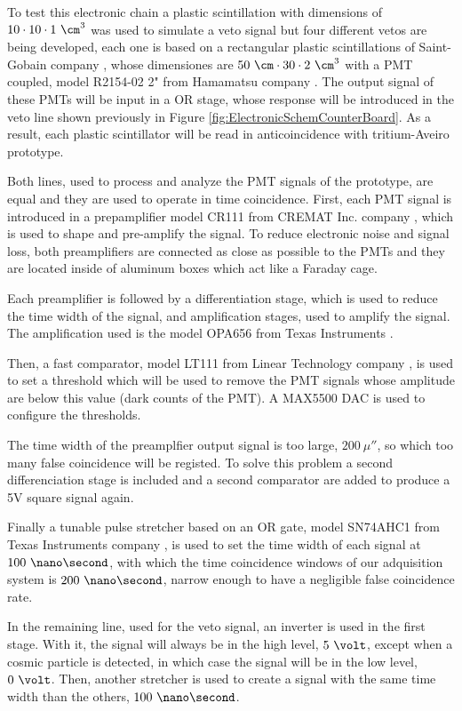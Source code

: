 \begin{enumerate}
To test this electronic chain a plastic scintillation with dimensions of $10 \cdot{} 10 \cdot{} 1~\cm^3$ was used to simulate a veto signal but four different vetos are being developed, each one is based on a rectangular plastic scintillations of Saint-Gobain company \cite{VetoAveiro}, whose dimensiones are $50~\cm \cdot{} 30 \cdot{} 2~\cm^3$  with a PMT coupled, model R2154-02 2" from Hamamatsu company \cite{DataSheetPMTsAveiro}. The output signal of these PMTs will be input in a OR stage, whose response will be introduced in the veto line shown previously in Figure \ref{fig:ElectronicSchemCounterBoard}. As a result, each plastic scintillator will be read in anticoincidence with tritium-Aveiro prototype.

Both lines, used to process and analyze the PMT signals of the prototype, are equal and they are used to operate in time coincidence. First, each PMT signal is introduced in a prepamplifier model CR111 from CREMAT Inc. company \cite{CREMATPreAmplifierDataSheet}, which is used to shape and pre-amplify the signal. To reduce electronic noise and signal loss, both preamplifiers are connected as close as possible to the PMTs and they are located inside of aluminum boxes which act like a Faraday cage.

Each preamplifier is followed by a differentiation stage, which is used to reduce the time width of the signal, and amplification stages, used to amplify the signal. The amplification used is the model OPA656 from Texas Instruments \cite{OPA656}. 

Then, a fast comparator, model LT111 from Linear Technology company \cite{LT111}, is used to set a threshold which will be used to remove the PMT signals whose amplitude are below this value (dark counts of the PMT). A MAX5500 DAC is used to configure the thresholds.

The time width of the preamplfier output signal is too large, $200~\mu\second$, so which too many false coincidence will be registed. To solve this problem a second differenciation stage is included and a second comparator are added to produce a 5V square signal again.

Finally a tunable pulse stretcher based on an OR gate, model SN74AHC1 from Texas Instruments company \cite{Stretcher}, is used to set the time width of each signal at $100~\nano\second$, with which the time coincidence windows of our adquisition system is $200~\nano\second$, narrow enough to have a negligible false coincidence rate.

In the remaining line, used for the veto signal, an inverter is used in the first stage. With it, the signal will always be in the high level, $5~\volt$, except when a cosmic particle is detected, in which case the signal will be in the low level, $0~\volt$. Then, another stretcher is used to create a signal with the same time width than the others, $100~\nano\second$.


\end{enumerate}

